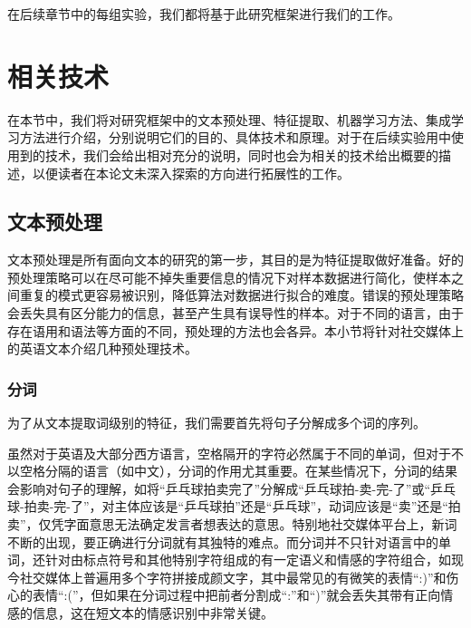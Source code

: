 在后续章节中的每组实验，我们都将基于此研究框架进行我们的工作。

\section{相关技术}
\label{sec:technology}

在本节中，我们将对研究框架中的文本预处理、特征提取、机器学习方法、集成学习方法进行介绍，分别说明它们的目的、具体技术和原理。对于在后续实验用中使用到的技术，我们会给出相对充分的说明，同时也会为相关的技术给出概要的描述，以便读者在本论文未深入探索的方向进行拓展性的工作。

\subsection{文本预处理}
\label{ssec:text_preprocess}

文本预处理是所有面向文本的研究的第一步，其目的是为特征提取做好准备。好的预处理策略可以在尽可能不掉失重要信息的情况下对样本数据进行简化，使样本之间重复的模式更容易被识别，降低算法对数据进行拟合的难度。错误的预处理策略会丢失具有区分能力的信息，甚至产生具有误导性的样本。对于不同的语言，由于存在语用和语法等方面的不同，预处理的方法也会各异。本小节将针对社交媒体上的英语文本介绍几种预处理技术。

\subsubsection{分词}
\label{sssec:tokenization}

为了从文本提取词级别的特征，我们需要首先将句子分解成多个词的序列。

虽然对于英语及大部分西方语言，空格隔开的字符必然属于不同的单词，但对于不以空格分隔的语言（如中文），分词的作用尤其重要。在某些情况下，分词的结果会影响对句子的理解，如将“乒乓球拍卖完了”分解成“乒乓球拍-卖-完-了”或“乒乓球-拍卖-完-了”，对主体应该是“乒乓球拍”还是“乒乓球”，动词应该是“卖”还是“拍卖”，仅凭字面意思无法确定发言者想表达的意思。特别地社交媒体平台上，新词不断的出现，要正确进行分词就有其独特的难点。而分词并不只针对语言中的单词，还针对由标点符号和其他特别字符组成的有一定语义和情感的字符组合，如现今社交媒体上普遍用多个字符拼接成颜文字，其中最常见的有微笑的表情“:)”和伤心的表情“:(”，但如果在分词过程中把前者分割成“:”和“)”就会丢失其带有正向情感的信息，这在短文本的情感识别中非常关键。

